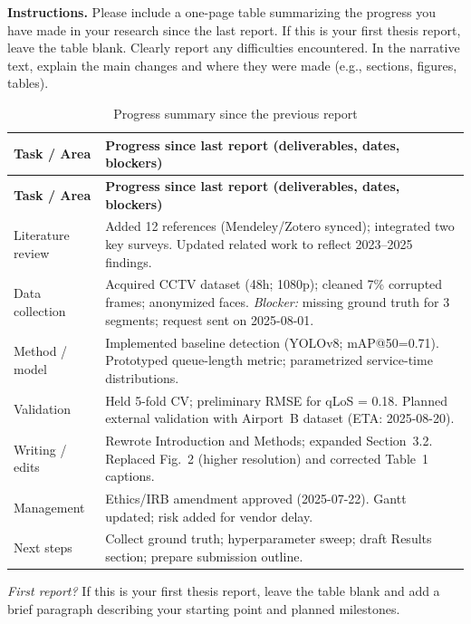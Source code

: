 \noindent\textbf{Instructions.} Please include a one-page table summarizing the
progress you have made in your research since the last report. If this is your
first thesis report, leave the table blank. Clearly report any difficulties
encountered. In the narrative text, explain the main changes and where they
were made (e.g., sections, figures, tables).

\begin{longtable}{p{} p{}}
\caption{Progress summary since the previous report}\label{tab:progress}\\
\toprule
\textbf{Task / Area} & \textbf{Progress since last report (deliverables, dates, blockers)}\\
\midrule
\endfirsthead
\toprule
\textbf{Task / Area} & \textbf{Progress since last report (deliverables, dates, blockers)}\\
\midrule
\endhead

Literature review &
Added 12 references (Mendeley/Zotero synced); integrated two key surveys.
Updated related work to reflect 2023–2025 findings. \\

Data collection &
Acquired CCTV dataset (48h; 1080p); cleaned 7\% corrupted frames; anonymized faces.
\textit{Blocker:} missing ground truth for 3 segments; request sent on 2025-08-01. \\

Method / model &
Implemented baseline detection (YOLOv8; mAP@50=0.71).
Prototyped queue-length metric; parametrized service-time distributions. \\

Validation &
Held 5-fold CV; preliminary RMSE for qLoS = 0.18.
Planned external validation with Airport~B dataset (ETA: 2025-08-20). \\

Writing / edits &
Rewrote Introduction and Methods; expanded Section~3.2.
Replaced Fig.~2 (higher resolution) and corrected Table~1 captions. \\

Management &
Ethics/IRB amendment approved (2025-07-22). Gantt updated; risk added for vendor delay. \\

Next steps &
Collect ground truth; hyperparameter sweep; draft Results section; prepare submission outline. \\

\bottomrule
\end{longtable}

\noindent\emph{First report?} If this is your first thesis report, leave the table
blank and add a brief paragraph describing your starting point and planned milestones.

